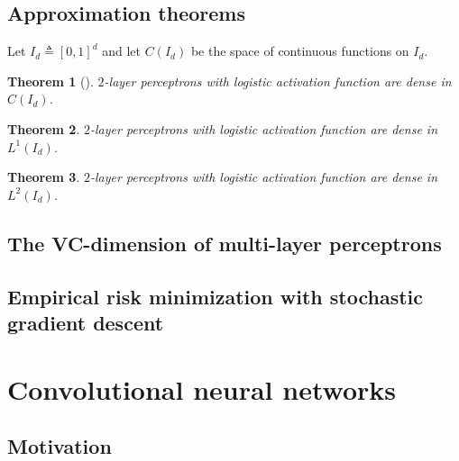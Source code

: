 \documentclass{article}
\newtheorem{theorem}{Theorem}
\begin{document}
\subsection{Approximation theorems}

Let $I_d \triangleq [0, 1]^d$ and let $C (I_d)$ be the space of continuous functions on $I_d$.

\begin{theorem}[\cite{cybenko1989approximation}]
$2$-layer perceptrons with logistic activation function are dense in $C (I_d)$.
\end{theorem}

\begin{theorem}
$2$-layer perceptrons with logistic activation function are dense in $L^1 (I_d)$.
\end{theorem}

\begin{theorem}
$2$-layer perceptrons with logistic activation function are dense in $L^2 (I_d)$.
\end{theorem}

\subsection{The VC-dimension of multi-layer perceptrons}

\subsection{Empirical risk minimization with stochastic gradient descent}

\section{Convolutional neural networks}

\subsection{Motivation}



\end{document}
